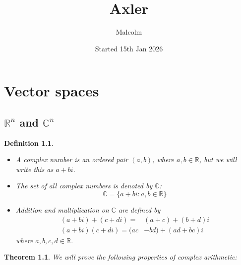 \documentclass{report}
\title{Axler}
\date{Started 15th Jan 2026}
\author{Malcolm}
\newtheorem{theorem}[theo]{Theorem}
\newtheorem{definition}[theo]{Definition}
\begin{document}
\maketitle

\tableofcontents

\chapter{Vector spaces}
\section{$\mathbb R^n$ and $\mathbb C^n$}
\begin{definition}\hspace{1mm}
\begin{itemize}
\item A \textit{complex number} is an ordered pair $(a,b)$, where $a,b\in\mathbb R$, but we will write this as $a+bi$.
\item The set of all complex numbers is denoted by $\mathbb C$:
\begin{equation*}
\mathbb C=\{a+bi:a,b\in\mathbb R\}
\end{equation*}
\item\textit{Addition} and \textit{multiplication} on $\mathbb C$ are defined by
\begin{align*}
(a+bi)+(c+di)=&(a+c)+(b+d)i\\
(a+bi)(c+di)=(ac&-bd)+(ad+bc)i
\end{align*}
where $a,b,c,d\in\mathbb R$.
\end{itemize}
\end{definition}
\begin{theorem}
We will prove the following properties of complex arithmetic:
\end{theorem}
\end{document}
